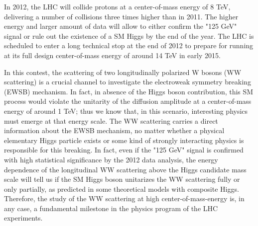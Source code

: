 \documentclass[10pt, a4paper]{article}
\begin{document}
In 2012, the LHC will collide protons at a center-of-mass energy of 8 TeV, delivering 
a number of collisions three times higher than in 2011. The higher energy and larger 
amount of data will allow to either confirm the "125 GeV" signal or rule out the existence 
of a SM Higgs by the end of the year. The LHC is scheduled to enter a 
long technical stop at the end of 2012 to prepare for running at its full design 
center-of-mass energy of around 14 TeV in early 2015.

In this contest, the scattering of two longitudinally polarized 
W bosons (WW scattering) is a crucial channel to 
investigate the electroweak symmetry breaking (EWSB) mechanism.
In fact, in absence of the Higgs boson contribution, this SM process
would violate the unitarity of the diffusion amplitude
at a center-of-mass energy of around 1 TeV; thus we know that, in this scenario, 
interesting physics must emerge at that energy scale.
The WW scattering carries a direct information about the EWSB 
mechanism, no matter whether a physical elementary Higgs particle 
exists or some kind of strongly interacting physics is responsible for this breaking. 
In fact, even if the "125 GeV" signal is confirmed with high statistical significance by the 
2012 data analysis, the energy dependence of the longitudinal WW scattering 
above the Higgs candidate mass scale will tell us if the SM Higgs boson 
unitarizes the WW scattering fully or only partially, as predicted in some 
theoretical models with composite Higgs. Therefore, the study of the WW scattering 
at high center-of-mass-energy is, in any case, a fundamental milestone 
in the physics program of the LHC experiments. \\
\end{document}

